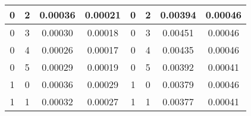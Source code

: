 \begin{table}[H]
\begin{tabular}{|c|c|c|c|c|c|c|c|}
0                                      & 2                                      & 0.00036                                                             & 0.00021                                                                 & 0                                      & 2                                     & 0.00394                                                             & 0.00046                                                                 \\ \hline
0                                      & 3                                      & 0.00030                                                             & 0.00018                                                                 & 0                                      & 3                                     & 0.00451                                                             & 0.00046                                                                 \\ \hline
0                                      & 4                                      & 0.00026                                                             & 0.00017                                                                 & 0                                      & 4                                     & 0.00435                                                             & 0.00046                                                                 \\ \hline
0                                      & 5                                      & 0.00029                                                             & 0.00019                                                                 & 0                                      & 5                                     & 0.00392                                                             & 0.00041                                                                 \\ \hline
1                                      & 0                                      & 0.00036                                                             & 0.00029                                                                 & 1                                      & 0                                     & 0.00379                                                             & 0.00046                                                                 \\ \hline
1                                      & 1                                      & 0.00032                                                             & 0.00027                                                                 & 1                                      & 1                                     & 0.00377                                                             & 0.00041                                                                 \\ \hline

\end{tabular}
\end{table}
